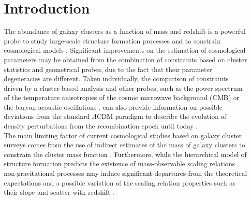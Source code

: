 \documentclass[traditabstract]{aa}
\begin{document}
\section{Introduction}\label{sec:Introduction}

\indent The abundance of galaxy clusters as a function of mass and redshift is a powerful probe to study large-scale structure formation processes and to constrain cosmological models \citep[\emph{e.g.,}][]{pla16a,deh16}. Significant improvements on the estimation of cosmological parameters may be obtained from the combination of constraints based on cluster statistics and geometrical probes, due to the fact that their parameter degeneracies are different. Taken individually, the comparison of constraints driven by a cluster-based analysis and other probes, such as the power spectrum of the temperature anisotropies of the cosmic microwave background (CMB) \citep{pla16b} or the baryon acoustic oscillations \citep{and14}, can also provide information on possible deviations from the standard $\Lambda$CDM paradigm to describe the evolution of density perturbations from the recombination epoch until today \citep[\emph{e.g.,}][]{pla16a}.\\
\indent The main limiting factor of current cosmological studies based on galaxy cluster surveys comes from the use of indirect estimates of the mass of galaxy clusters to constrain the cluster mass function \citep[\emph{e.g.,}][]{tin08}. Furthermore, while the hierarchical model of structure formation predicts the existence of mass-observable scaling relations \citep{kai86}, non-gravitational processes may induce significant departures from the theoretical expectations and a possible variation of the scaling relation properties such as their slope and scatter with redshift \citep[\emph{e.g.,}][]{evr91}.\\
\end{document}
